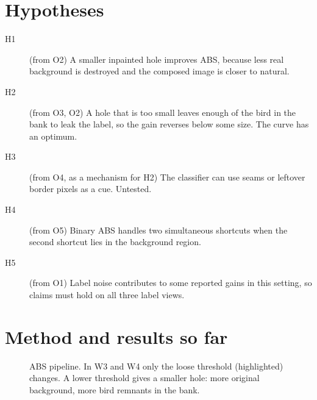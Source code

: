 \documentclass[runningheads]{llncs}
\begin{document}
\section{Hypotheses}

\begin{description}
\item[H1] (from O2) A smaller inpainted hole improves ABS, because less real background is destroyed and the composed image is closer to natural.
\item[H2] (from O3, O2) A hole that is too small leaves enough of the bird in the bank to leak the label, so the gain reverses below some size. The curve has an optimum.
\item[H3] (from O4, as a mechanism for H2) The classifier can use seams or leftover border pixels as a cue. Untested.
\item[H4] (from O5) Binary ABS handles two simultaneous shortcuts when the second shortcut lies in the background region.
\item[H5] (from O1) Label noise contributes to some reported gains in this setting, so claims must hold on all three label views.
\end{description}

\section{Method and results so far}\label{sec:res}

\begin{figure}[H]
\centering
{}
\caption{ABS pipeline. In W3 and W4 only the loose threshold (highlighted) changes. A lower threshold gives a smaller hole: more original background, more bird remnants in the bank.}
\label{fig:pipe}
\end{figure}
\end{document}
